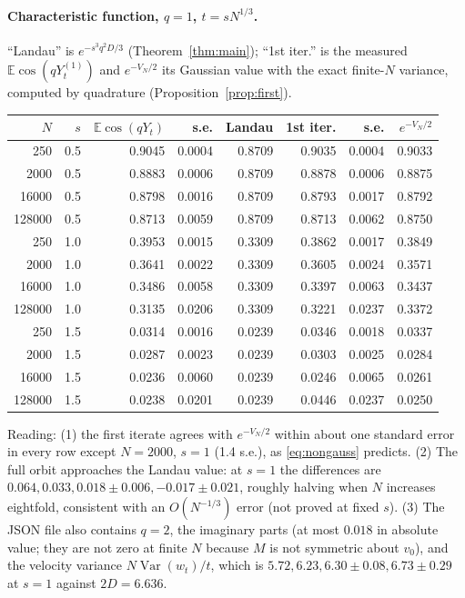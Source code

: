 \documentclass[11pt]{article}
\newcommand{\E}{\mathbb{E}}
\theoremstyle{remark}
\begin{document}
\paragraph{Characteristic function, $q=1$, $t=sN^{1/3}$.} ``Landau'' is
$e^{-s^3q^2D/3}$ (Theorem~\ref{thm:main}); ``1st iter.'' is the measured
$\E\cos(qY^{(1)}_t)$ and $e^{-V_N/2}$ its Gaussian value with the exact
finite-$N$ variance, computed by quadrature
(Proposition~\ref{prop:first}).
\begin{center}
\begin{tabular}{rrrrrrrr}
 $N$ & $s$ & $\E\cos(qY_t)$ & s.e. & Landau & 1st iter. & s.e. & $e^{-V_N/2}$\\ \hline
 250 & 0.5 & 0.9045 & 0.0004 & 0.8709 & 0.9035 & 0.0004 & 0.9033\\
 2000 & 0.5 & 0.8883 & 0.0006 & 0.8709 & 0.8878 & 0.0006 & 0.8875\\
 16000 & 0.5 & 0.8798 & 0.0016 & 0.8709 & 0.8793 & 0.0017 & 0.8792\\
 128000 & 0.5 & 0.8713 & 0.0059 & 0.8709 & 0.8713 & 0.0062 & 0.8750\\ \hline
 250 & 1.0 & 0.3953 & 0.0015 & 0.3309 & 0.3862 & 0.0017 & 0.3849\\
 2000 & 1.0 & 0.3641 & 0.0022 & 0.3309 & 0.3605 & 0.0024 & 0.3571\\
 16000 & 1.0 & 0.3486 & 0.0058 & 0.3309 & 0.3397 & 0.0063 & 0.3437\\
 128000 & 1.0 & 0.3135 & 0.0206 & 0.3309 & 0.3221 & 0.0237 & 0.3372\\ \hline
 250 & 1.5 & 0.0314 & 0.0016 & 0.0239 & 0.0346 & 0.0018 & 0.0337\\
 2000 & 1.5 & 0.0287 & 0.0023 & 0.0239 & 0.0303 & 0.0025 & 0.0284\\
 16000 & 1.5 & 0.0236 & 0.0060 & 0.0239 & 0.0246 & 0.0065 & 0.0261\\
 128000 & 1.5 & 0.0238 & 0.0201 & 0.0239 & 0.0446 & 0.0237 & 0.0250\\
\end{tabular}
\end{center}
Reading: (1) the first iterate agrees with $e^{-V_N/2}$ within about one
standard error in every row except $N=2000$, $s=1$ (1.4 s.e.), as
\eqref{eq:nongauss} predicts. (2) The full orbit approaches the Landau
value: at $s=1$ the differences are $0.064,0.033,0.018\pm0.006,
-0.017\pm0.021$, roughly halving when $N$ increases eightfold, consistent
with an $O(N^{-1/3})$ error (not proved at fixed $s$). (3) The JSON file
also contains $q=2$, the imaginary parts (at most $0.018$ in absolute value;
they are not zero at finite $N$ because $M$ is not symmetric about $v_0$),
and the velocity variance $N\operatorname{Var}(w_t)/t$, which is
$5.72,6.23,6.30\pm0.08,6.73\pm0.29$ at $s=1$ against $2D=6.636$.
\end{document}
